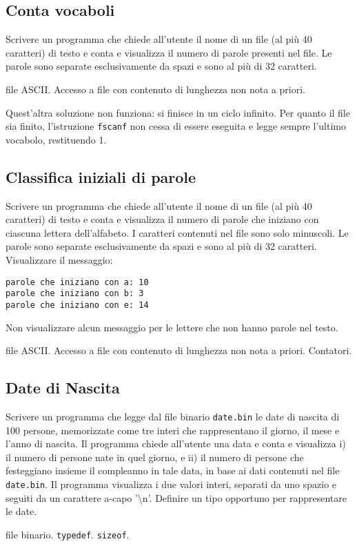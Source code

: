 \subsection{Conta vocaboli}
Scrivere un programma che chiede all'utente il nome di un file (al pi\`u 40 caratteri) di testo e conta e visualizza il numero di parole presenti nel file. Le parole sono separate esclusivamente da spazi e sono al pi\`u di 32 caratteri.

\begin{tags}
file ASCII. Accesso a file con contenuto di lunghezza non nota a priori.
\end{tags}

Quest'altra soluzione non funziona: si finisce in un ciclo infinito. Per quanto il file sia finito, l'istruzione \texttt{fscanf} non cessa di essere eseguita e legge sempre l'ultimo vocabolo, restituendo 1.


\subsection{Classifica iniziali di parole}
Scrivere un programma che chiede all'utente il nome di un file (al pi\`u 40 caratteri) di testo e conta e visualizza il numero di parole che iniziano con ciascuna lettera dell'alfabeto. I caratteri contenuti nel file sono solo minuscoli. Le parole sono separate esclusivamente da spazi e sono al pi\`u di 32 caratteri. 
Visualizzare il messaggio: 
\begin{verbatim}
parole che iniziano con a: 10
parole che iniziano con b: 3
parole che iniziano con e: 14
\end{verbatim}
Non visualizzare alcun messaggio per le lettere che non hanno parole nel testo.

\begin{tags}
file ASCII. Accesso a file con contenuto di lunghezza non nota a priori. Contatori.
\end{tags}

\subsection{Date di Nascita}

Scrivere un programma che legge dal file binario \texttt{date.bin} le date di nascita di 100 persone, memorizzate come tre interi che rappresentano il giorno, il mese e l'anno di nascita. Il programma chiede all'utente una data e conta e visualizza i) il numero di persone nate in quel giorno, e ii) il numero di persone che festeggiano insieme il compleanno in tale data, in base ai dati contenuti nel file \texttt{date.bin}. Il programma visualizza i due valori interi, separati da uno spazio e seguiti da un carattere a-capo '\textbackslash n'. Definire un tipo opportuno per rappresentare le date.

\begin{tags}
file binario. \texttt{typedef}. \texttt{sizeof}.
\end{tags}


